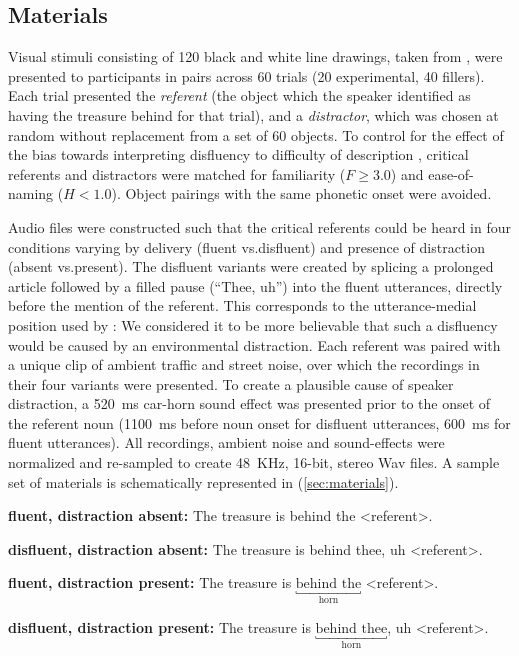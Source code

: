 \documentclass[a4paper,man,natbib]{apa6}
\newcommand*{\spex}[1]{``{#1}''} %
\begin{document}
\subsection{Materials}
Visual stimuli consisting of 120 black and white line drawings, taken from \citet{Snodgrass1980}, were presented to participants in pairs across 60 trials (20 experimental, 40 fillers). 
Each trial presented the \textit{referent} (the object which the speaker identified as having the treasure behind for that trial), and a \textit{distractor}, which was chosen at random without replacement from a set of 60 objects. 
To control for the effect of the bias towards interpreting disfluency to difficulty of description \citep{Arnold2007}, critical referents and distractors were matched for familiarity ($F \ge 3.0$) and ease-of-naming ($H <1.0$). 
Object pairings with the same phonetic onset were avoided. 

Audio files were constructed such that the critical referents could be heard in four conditions varying by delivery (fluent vs.\@ disfluent) and presence of distraction (absent vs.\@ present). 
The disfluent variants were created by splicing a prolonged article followed by a filled pause (\spex{Thee, uh}) into the fluent utterances, directly before the mention of the referent.
This corresponds to the utterance-medial position used by \citet{Loy2016}:
We considered it to be more believable that such a disfluency would be caused by an environmental distraction.
Each referent was paired with a unique clip of ambient traffic and street noise, over which the recordings in their four variants were presented.
To create a plausible cause of speaker distraction, a 520~ms car-horn sound effect was presented prior to the onset of the referent noun (1100~ms before noun onset for disfluent utterances, 600~ms for fluent utterances). 
All recordings, ambient noise and sound-effects were normalized and re-sampled to create 48~KHz, 16-bit, stereo Wav files.
A sample set of materials is schematically represented in (\ref{sec:materials}).

\begin{examples}\label{sec:materials}
\item \textbf{fluent, distraction absent:} The treasure is behind the \textless referent\textgreater .
\item \textbf{disfluent, distraction absent:} The treasure is behind thee, uh \textless referent\textgreater .
\item \textbf{fluent, distraction present:} The treasure is $\underbracket{\text{behind the}}_\text{horn}$ \textless referent\textgreater .
\item \textbf{disfluent, distraction present:} The treasure is $\underbracket{\text{behind thee}}_\text{horn}$, uh \textless referent\textgreater .
\end{examples}
\end{document}
